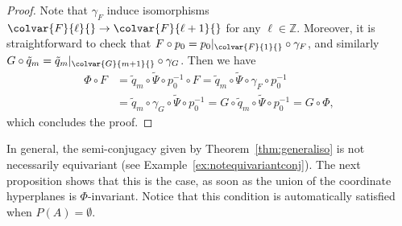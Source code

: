 \documentclass[JEP,XML,SOM,Unicode,NoFloatCountersInSection]{cedram}
\theoremstyle{definition}
\let\wt\widetilde
\newcommand{\ZZ}{\mathbb{Z}}
\begin{document}
\begin{proof}
Note that $\gamma_F$ induce isomorphisms $\colvar{F}{\ell}{} \to \colvar{F}{\ell+1}{}$ for any $\ell \in \ZZ$. Moreover, it is straightforward to check that $F \circ p_0 =p_0|_{\colvar{F}{1}{}} \circ \gamma_F$, and similarly $G \circ \tilde q_m = \tilde q_m|_{\colvar{G}{m+1}{}} \circ \gamma_G$.
Then we have
\begin{align*}
\Phi \circ F
&= \tilde q_m \circ \wt{\Psi} \circ p_0^{-1}\circ F
=\tilde q_m \circ \wt{\Psi} \circ \gamma_F \circ p_0^{-1}\\
&=\tilde q_m \circ \gamma_G \circ \wt{\Psi} \circ p_0^{-1}
= G \circ \tilde q_m \circ \wt{\Psi} \circ p_0^{-1}
= G \circ \Phi,
\end{align*}
which concludes the proof.
\end{proof}

In general, the semi-conjugacy given by Theorem~\ref{thm:generaliso} is not necessarily equivariant (see Example~\ref{ex:notequivariantconj}).
The next proposition shows that this is the case, as soon as the union of the coordinate hyperplanes is $\Phi$-invariant.
Notice that this condition is automatically satisfied when $P(A)=\emptyset$.
\end{document}
